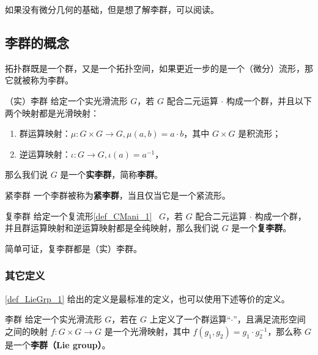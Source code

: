 

如果没有微分几何的基础，但是想了解李群，可以阅读。

\subsection{李群的概念}

拓扑群既是一个群，又是一个拓扑空间，如果更近一步的是一个（微分）流形，那它就被称为李群。
\begin{definition}{（实）李群}\label{def_LieGrp_1}
给定一个实光滑流形 $G$，若 $G$ 配合二元运算 $\cdot$ 构成一个群，并且以下两个映射都是光滑映射：
\begin{enumerate}
\item 群运算映射：$\mu:G\times G\to G, \mu(a,b)=a\cdot b$，其中 $G\times G$ 是积流形；
\item 逆运算映射：$\iota:G\to G, \iota(a)=a^{-1}$，
\end{enumerate}
那么我们说 $G$ 是一个\textbf{实李群}，简称\textbf{李群}。
\end{definition}

\begin{definition}{紧李群}
一个李群被称为\textbf{紧李群}，当且仅当它是一个紧流形。
\end{definition}

\begin{definition}{复李群}\label{def_LieGrp_6}
给定一个复流形\autoref{def_CMani_1}~ $G$，若 $G$ 配合二元运算 $\cdot$ 构成一个群，并且群运算映射和逆运算映射都是全纯映射，那么我们说 $G$ 是一个\textbf{复李群}。
\end{definition}
简单可证，复李群都是（实）李群。


\subsubsection{其它定义}

\autoref{def_LieGrp_1} 给出的定义是最标准的定义，也可以使用下述等价的定义。

\begin{definition}{李群}\label{def_LieGrp_3}
给定一个实光滑流形 $G$，若在 $G$ 上定义了一个群运算“$\cdot$”，且满足流形空间之间的映射 $f:G\times G\rightarrow G$ 是一个光滑映射，其中 $f(g_1, g_2)=g_1\cdot g_2^{-1}$，那么称 $G$ 是一个\textbf{李群（Lie group）}。
\end{definition}

